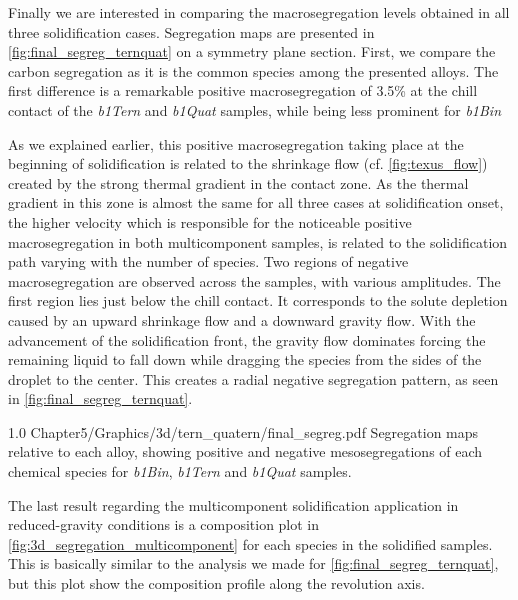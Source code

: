 Finally we are interested in comparing the macrosegregation levels obtained in all three solidification cases. Segregation maps
are presented in \cref{fig:final_segreg_ternquat} on a symmetry plane section. First, we compare the carbon segregation as it is the common species among the presented alloys.
The first difference is a remarkable positive macrosegregation of 3.5\% at the chill contact of the  \emph{b1Tern} and \emph{b1Quat} samples, 
while being less prominent for \emph{b1Bin} 

As we explained earlier, this positive macrosegregation taking place at the beginning
of solidification is related to the shrinkage flow (cf. \cref{fig:texus_flow}) created by the strong thermal gradient in the contact zone. 
As the thermal gradient in this zone is almost the same
for all three cases at solidification onset, the higher velocity which is responsible for the noticeable positive macrosegregation in both multicomponent samples,
is related to the solidification path varying with the number of species.
Two regions of negative macrosegregation are observed across the samples, with various amplitudes. The first region lies just below the chill contact.
It corresponds to the solute depletion caused by an upward shrinkage flow and a downward gravity flow. 
With the advancement of the solidification front,
the gravity flow dominates forcing the remaining liquid to fall down while dragging the species from the sides of the droplet to the center.
This creates a radial negative segregation pattern, as seen in \cref{fig:final_segreg_ternquat}. 


\begin{figureth}
{1.0}
{Chapter5/Graphics/3d/tern_quatern/final_segreg.pdf}
{Segregation maps relative to each alloy, showing positive and negative mesosegregations 
of each chemical species for \emph{b1Bin}, \emph{b1Tern} and \emph{b1Quat} samples.}
\label{fig:final_segreg_ternquat}
\end{figureth}

The last result regarding the multicomponent solidification application in reduced-gravity conditions 
is a composition plot in \cref{fig:3d_segregation_multicomponent} for each species in the solidified samples. 
This is basically similar to the analysis we made for \cref{fig:final_segreg_ternquat}, 
but this plot show the composition profile along the revolution axis.

